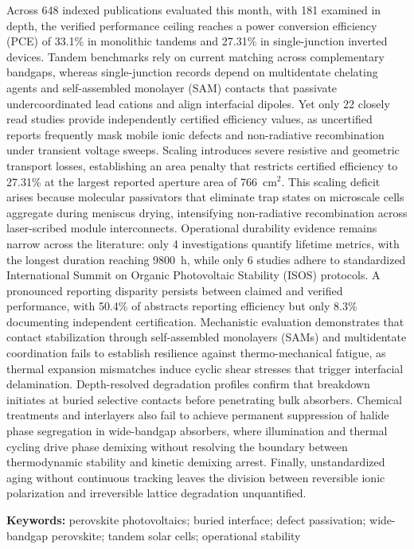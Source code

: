 \documentclass[
  11pt,
]{article}
\begin{document}
Across 648 indexed publications evaluated this month, with 181 examined
in depth, the verified performance ceiling reaches a power conversion
efficiency (PCE) of 33.1\% in monolithic tandems and 27.31\% in
single-junction inverted devices. Tandem benchmarks rely on current
matching across complementary bandgaps, whereas single-junction records
depend on multidentate chelating agents and self-assembled monolayer
(SAM) contacts that passivate undercoordinated lead cations and align
interfacial dipoles. Yet only 22 closely read studies provide
independently certified efficiency values, as uncertified reports
frequently mask mobile ionic defects and non-radiative recombination
under transient voltage sweeps. Scaling introduces severe resistive and
geometric transport losses, establishing an area penalty that restricts
certified efficiency to 27.31\% at the largest reported aperture area of
\qty{766}{\centi\meter}\(^2\). This scaling deficit arises because
molecular passivators that eliminate trap states on microscale cells
aggregate during meniscus drying, intensifying non-radiative
recombination across laser-scribed module interconnects. Operational
durability evidence remains narrow across the literature: only 4
investigations quantify lifetime metrics, with the longest duration
reaching \qty{9800}{\hour}, while only 6 studies adhere to standardized
International Summit on Organic Photovoltaic Stability (ISOS) protocols.
A pronounced reporting disparity persists between claimed and verified
performance, with 50.4\% of abstracts reporting efficiency but only
8.3\% documenting independent certification. Mechanistic evaluation
demonstrates that contact stabilization through self-assembled
monolayers (SAMs) and multidentate coordination fails to establish
resilience against thermo-mechanical fatigue, as thermal expansion
mismatches induce cyclic shear stresses that trigger interfacial
delamination. Depth-resolved degradation profiles confirm that breakdown
initiates at buried selective contacts before penetrating bulk
absorbers. Chemical treatments and interlayers also fail to achieve
permanent suppression of halide phase segregation in wide-bandgap
absorbers, where illumination and thermal cycling drive phase demixing
without resolving the boundary between thermodynamic stability and
kinetic demixing arrest. Finally, unstandardized aging without
continuous tracking leaves the division between reversible ionic
polarization and irreversible lattice degradation unquantified.

\textbf{Keywords:} perovskite photovoltaics; buried interface; defect
passivation; wide-bandgap perovskite; tandem solar cells; operational
stability
\end{document}
